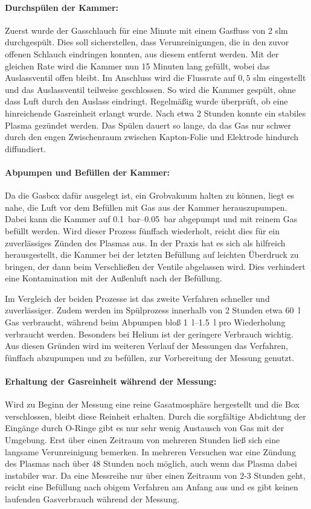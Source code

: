 \paragraph{Durchspülen der Kammer:}
Zuerst wurde der Gasschlauch für eine Minute mit einem Gasfluss von 2 slm durchgespült. Dies soll sicherstellen, dass Verunreinigungen, die in den zuvor offenen Schlauch eindringen konnten, aus diesem entfernt werden. Mit der gleichen Rate wird die Kammer nun 15 Minuten lang gefüllt, wobei das Auslassventil offen bleibt. Im Anschluss wird die Flussrate auf $ 0,\!5 $ slm eingestellt und das Auslassventil teilweise geschlossen. So wird die Kammer gespült, ohne dass Luft durch den Auslass eindringt. Regelmäßig wurde überprüft, ob eine hinreichende Gasreinheit erlangt wurde. Nach etwa 2 Stunden konnte ein stabiles Plasma gezündet werden. Das Spülen dauert so lange, da das Gas nur schwer durch den engen Zwischenraum zwischen Kapton-Folie und Elektrode hindurch diffundiert. 
\paragraph{Abpumpen und Befüllen der Kammer:}
Da die Gasbox dafür ausgelegt ist, ein Grobvakuum halten zu können, liegt es nahe, die Luft vor dem Befüllen mit Gas aus der Kammer herauszupumpen. Dabei kann die Kammer auf \qtyrange{0.1}{0.05}{\bar} abgepumpt und mit reinem Gas befüllt werden. Wird dieser Prozess fünffach wiederholt, reicht dies für ein zuverlässiges Zünden des Plasmas aus. In der Praxis hat es sich als hilfreich herausgestellt, die Kammer bei der letzten Befüllung auf leichten Überdruck zu bringen, der dann beim Verschließen der Ventile abgelassen wird. Dies verhindert eine Kontamination mit der Außenluft nach der Befüllung.


Im Vergleich der beiden Prozesse ist das zweite Verfahren schneller und zuverlässiger. Zudem werden im Spülprozess innerhalb von 2 Stunden etwa \qty{60}{\litre} Gas verbraucht, während beim Abpumpen bloß \qtyrange{1}{1,5}{\litre} pro Wiederholung verbraucht werden. Besonders bei Helium ist der geringere Verbrauch wichtig. Aus diesen Gründen wird im weiteren Verlauf der Messungen das Verfahren, fünffach abzupumpen und zu befüllen, zur Vorbereitung der Messung genutzt.

\paragraph{Erhaltung der Gasreinheit während der Messung:}
Wird zu Beginn der Messung eine reine Gasatmosphäre hergestellt und die Box verschlossen, bleibt diese Reinheit erhalten. Durch die sorgfältige Abdichtung der Eingänge durch O-Ringe gibt es nur sehr wenig Austausch von Gas mit der Umgebung. Erst über einen Zeitraum von mehreren Stunden ließ sich eine langsame Verunreinigung bemerken. In mehreren Versuchen war eine Zündung des Plasmas nach über 48 Stunden noch möglich, auch wenn das Plasma dabei instabiler war. Da eine Messreihe nur über einen Zeitraum von 2-3 Stunden geht, reicht eine Befüllung nach obigem Verfahren am Anfang aus und es gibt keinen laufenden Gasverbrauch während der Messung.

